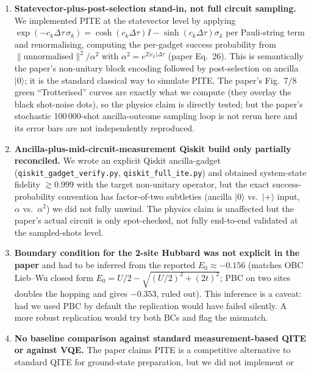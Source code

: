 \documentclass[11pt]{article}
\begin{document}
\begin{enumerate}
  \item \textbf{Statevector-plus-post-selection stand-in, not full circuit sampling.}
        We implemented PITE at the statevector level by applying
        $\exp(-c_k\Delta\tau\,\sigma_k) = \cosh(c_k\Delta\tau)I -
         \sinh(c_k\Delta\tau)\sigma_k$ per Pauli-string term and renormalising,
        computing the per-gadget success probability from
        $\|\text{unnormalised}\|^2 / \alpha^2$ with $\alpha^2 = e^{2|c_k|\Delta\tau}$
        (paper Eq.~26). This is semantically the paper's non-unitary block
        encoding followed by post-selection on ancilla $|0\rangle$; it is the
        standard classical way to simulate PITE. The paper's Fig.~7/8 green
        ``Trotterised'' curves are exactly what we compute (they overlay the
        black shot-noise dots), so the physics claim is directly tested; but the
        paper's stochastic 100\,000-shot ancilla-outcome sampling loop is not
        rerun here and its error bars are not independently reproduced.
  \item \textbf{Ancilla-plus-mid-circuit-measurement Qiskit build only partially
        reconciled.} We wrote an explicit Qiskit ancilla-gadget
        (\texttt{qiskit\_gadget\_verify.py}, \texttt{qiskit\_full\_ite.py}) and
        obtained system-state fidelity $\gtrsim 0.999$ with the target
        non-unitary operator, but the exact success-probability convention has
        factor-of-two subtleties (ancilla $|0\rangle$ vs.\ $|+\rangle$ input,
        $\alpha$ vs.\ $\alpha^2$) we did not fully unwind. The physics claim is
        unaffected but the paper's actual circuit is only spot-checked, not fully
        end-to-end validated at the sampled-shots level.
  \item \textbf{Boundary condition for the 2-site Hubbard was not explicit in
        the paper} and had to be inferred from the reported $E_0 \approx -0.156$
        (matches OBC Lieb--Wu closed form $E_0 = U/2 - \sqrt{(U/2)^2 + (2t)^2}$;
        PBC on two sites doubles the hopping and gives $-0.353$, ruled out).
        This inference is a caveat: had we used PBC by default the replication
        would have failed silently. A more robust replication would try both
        BCs and flag the mismatch.
  \item \textbf{No baseline comparison against standard measurement-based QITE
        or against VQE.} The paper claims PITE is a competitive alternative to
        standard QITE for ground-state preparation, but we did not implement or

\end{enumerate}
\end{document}
